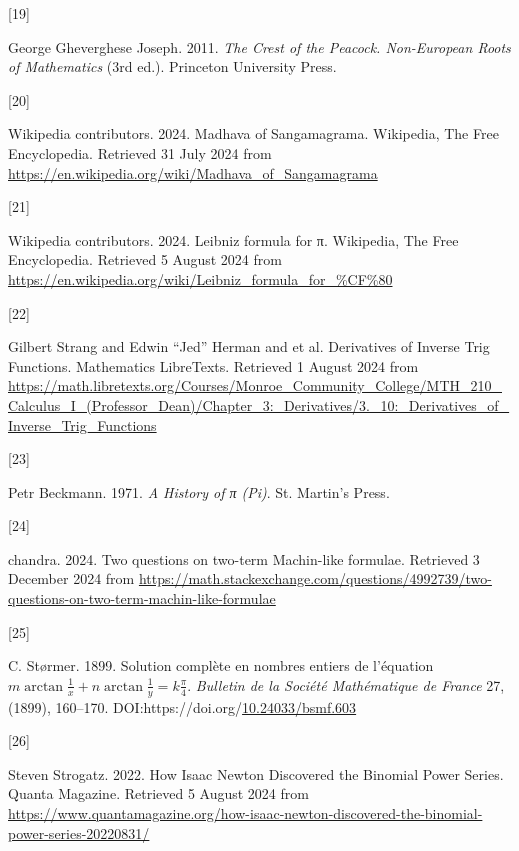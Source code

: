 \documentclass[
  a4paper,
]{article}
\newlength{\cslhangindent}
\newlength{\csllabelwidth}
\newenvironment{CSLReferences}[2] %
 {\begin{list}{}{%
  \setlength{\itemindent}{0pt}
  \setlength{\leftmargin}{0pt}
  \setlength{\parsep}{0pt}
  \ifodd #1
   \setlength{\leftmargin}{\cslhangindent}
   \setlength{\itemindent}{-1\cslhangindent}
  \fi
  \setlength{\itemsep}{#2\baselineskip}}}
 {\end{list}}
\newcommand{\CSLLeftMargin}[1]{\parbox[t]{\csllabelwidth}{\strut#1\strut}}
\newcommand{\CSLRightInline}[1]{\parbox[t]{\linewidth - \csllabelwidth}{\strut#1\strut}}
\begin{document}
\begin{CSLReferences}{0}{0}
\CSLLeftMargin{{[}19{]} }%
\CSLRightInline{George Gheverghese Joseph. 2011. \emph{{The Crest of the
Peacock}. {Non-European Roots of Mathematics}} (3rd ed.). Princeton
University Press.}

\CSLLeftMargin{{[}20{]} }%
\CSLRightInline{Wikipedia contributors. 2024. {Madhava of Sangamagrama}.
{Wikipedia, The Free Encyclopedia}. Retrieved 31 July 2024 from
\url{https://en.wikipedia.org/wiki/Madhava_of_Sangamagrama}}

\CSLLeftMargin{{[}21{]} }%
\CSLRightInline{Wikipedia contributors. 2024. {Leibniz formula for π}.
{Wikipedia, The Free Encyclopedia}. Retrieved 5 August 2024 from
\url{https://en.wikipedia.org/wiki/Leibniz_formula_for_\%CF\%80}}

\CSLLeftMargin{{[}22{]} }%
\CSLRightInline{Gilbert Strang and Edwin ``Jed'' Herman and et al.
{Derivatives of Inverse Trig Functions}. Mathematics LibreTexts.
Retrieved 1 August 2024 from
\url{https://math.libretexts.org/Courses/Monroe_Community_College/MTH_210_Calculus_I_(Professor_Dean)/Chapter_3:_Derivatives/3._10:_Derivatives_of_Inverse_Trig_Functions}}

\CSLLeftMargin{{[}23{]} }%
\CSLRightInline{Petr Beckmann. 1971. \emph{{A History of π (Pi)}}. St.
Martin's Press.}

\CSLLeftMargin{{[}24{]} }%
\CSLRightInline{chandra. 2024. {Two questions on two-term Machin-like
formulae}. Retrieved 3 December 2024 from
\url{https://math.stackexchange.com/questions/4992739/two-questions-on-two-term-machin-like-formulae}}

\CSLLeftMargin{{[}25{]} }%
\CSLRightInline{C. Størmer. 1899. Solution complète en nombres entiers
de l{'}équation
\(m\arctan \frac{1}{x}+n\arctan \frac{1}{y}=k\frac{\pi }{4}\).
\emph{Bulletin de la Société Mathématique de France} 27, (1899),
160--170.
DOI:https://doi.org/\href{https://doi.org/10.24033/bsmf.603}{10.24033/bsmf.603}}

\CSLLeftMargin{{[}26{]} }%
\CSLRightInline{Steven Strogatz. 2022. {How Isaac Newton Discovered the
Binomial Power Series}. {Quanta Magazine}. Retrieved 5 August 2024 from
\url{https://www.quantamagazine.org/how-isaac-newton-discovered-the-binomial-power-series-20220831/}}


\end{CSLReferences}
\end{document}
